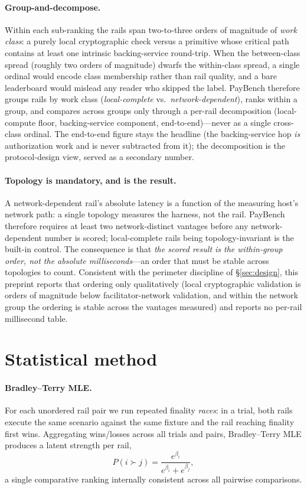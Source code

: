 \documentclass[11pt]{article}
\begin{document}
\paragraph{Group-and-decompose.} Within each sub-ranking the rails span two-to-three orders of
magnitude of \emph{work class}: a purely local cryptographic check versus a primitive whose critical
path contains at least one intrinsic backing-service round-trip. When the between-class spread (roughly
two orders of magnitude) dwarfs the within-class spread, a single ordinal would encode class membership
rather than rail quality, and a bare leaderboard would mislead any reader who skipped the label.
PayBench therefore groups rails by work class (\emph{local-complete} vs.\ \emph{network-dependent}),
ranks within a group, and compares across groups only through a per-rail decomposition (local-compute
floor, backing-service component, end-to-end)---never as a single cross-class ordinal. The end-to-end
figure stays the headline (the backing-service hop \emph{is} authorization work and is never subtracted
from it); the decomposition is the protocol-design view, served as a secondary number.

\paragraph{Topology is mandatory, and is the result.} A network-dependent rail's absolute latency is a
function of the measuring host's network path: a single topology measures the harness, not the rail.
PayBench therefore requires at least two network-distinct vantages before any network-dependent number
is scored; local-complete rails being topology-invariant is the built-in control. The consequence is
that \emph{the scored result is the within-group order, not the absolute milliseconds}---an order that
must be stable across topologies to count. Consistent with the perimeter discipline of
\S\ref{sec:design}, this preprint reports that ordering only qualitatively (local cryptographic
validation is orders of magnitude below facilitator-network validation, and within the network group
the ordering is stable across the vantages measured) and reports no per-rail millisecond table.

\section{Statistical method}\label{sec:stats}
\paragraph{Bradley--Terry MLE.} For each unordered rail pair we run repeated finality \emph{races}: in a
trial, both rails execute the same scenario against the same fixture and the rail reaching finality
first wins. Aggregating wins/losses across all trials and pairs, Bradley--Terry MLE produces a latent
strength per rail,
\[
  P(i \succ j) = \frac{e^{\beta_i}}{e^{\beta_i} + e^{\beta_j}},
\]
a single comparative ranking internally consistent across all pairwise comparisons.
\end{document}
